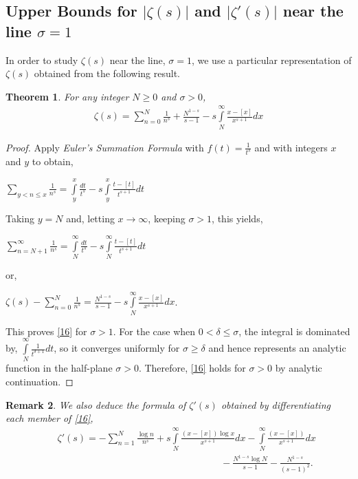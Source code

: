\documentclass[article,12pt]{elsarticle}
\newtheorem{thm}{Theorem}[section]
\newtheorem{rmk}[thm]{Remark}
\begin{document}
	\subsection{Upper Bounds for $|\zeta(s)|$ and $|\zeta'(s)|$ near the line $\sigma =1$}
	
	In order to study $\zeta(s)$ near the line, $\sigma =1$, we use a particular representation of $\zeta(s)$ obtained from the following result.
	\begin{thm}\label{thm10}
		For any integer $N\geq 0$ and $\sigma >0$,
		\begin{eqnarray}\label{16}
			\zeta(s)=\sum\limits_{n=0}^{N}\frac{1}{n^{s}}+\frac{N^{1-s}}{s-1}-s\int\limits_{N}^{\infty}\frac{x-[x]}{x^{s+1}}	dx
		\end{eqnarray}
	\end{thm}
	\begin{proof}
		Apply \textit{Euler's Summation Formula} with $f(t)=\frac{1}{t^{s}}$ and with integers $x$ and $y$ to obtain,
		\begin{center}
			$\sum\limits_{y<n\leq x}\frac{1}{n^{s}}=\int\limits_{y}^{x}\frac{dt}{t^{s}}-s\int\limits_{y}^{x}\frac{t-[t]}{t^{s+1}}	dt$
		\end{center}
		Taking $y=N$ and, letting $x\rightarrow \infty$, keeping $\sigma >1$, this yields,
		\begin{center}
			$\sum\limits_{n=N+1}^{\infty}\frac{1}{n^{s}}=\int\limits_{N}^{\infty}\frac{dt}{t^{s}}-s\int\limits_{N}^{\infty}\frac{t-[t]}{t^{s+1}}	dt$
		\end{center}
		
		or,
		\begin{center}
			$\zeta(s)-\sum\limits_{n=0}^{N}\frac{1}{n^{s}}=\frac{N^{1-s}}{s-1}-s\int\limits_{N}^{\infty}\frac{x-[x]}{x^{s+1}}	dx$.
		\end{center}	
		This proves \eqref{16} for $\sigma >1$. For the case when $0<\delta\leq \sigma$, the integral is dominated by, $\int\limits_{N}^{\infty}\frac{1}{t^{\delta +1}}	dt$,  so it converges uniformly for $\sigma \geq\delta$ and hence represents an analytic function in the half-plane \textbf{$\sigma>0$}. Therefore, \eqref{16} holds for $\sigma >0$ by analytic continuation.
	\end{proof}
	\begin{rmk}\label{rmk3}
		We also deduce the formula of $\zeta'(s)$ obtained by differentiating each member of \eqref{16},
		\begin{align*}
			\hspace{20pt} \zeta'(s)=-\sum\limits_{n=1}^{N}\frac{\log n}{n^{s}}+s\int\limits_{N}^{\infty}\frac{(x-[x])\log x}{x^{s+1}}dx-\int\limits_{N}^{\infty}\frac{(x-[x])}{x^{s+1}}dx 
		\end{align*}
		\begin{align}\label{17}
			\hspace{220pt}-\frac{N^{1-s}\log N}{s-1}-\frac{N^{1-s}}{(s-1)^{2}} .
		\end{align}
	\end{rmk}
\end{document}
